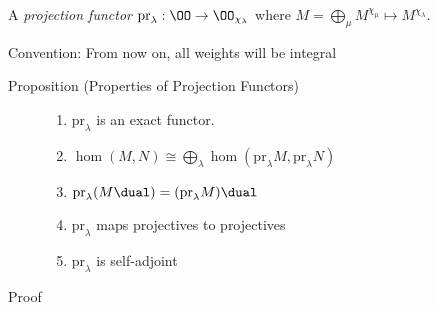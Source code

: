 \begin{description}
\tightlist
\item[Definition (Projection Functors)]
A \emph{projection functor}
\(\mathrm{pr}_\lambda: \OO \to \OO_{\chi_\lambda}\) where
\(M = \bigoplus_\mu M^{\chi_\mu} \mapsto M^{\chi_\lambda}\).
\end{description}

Convention: From now on, all weights will be integral

\begin{description}
\item[Proposition (Properties of Projection Functors)]
\hfill

\begin{enumerate}
\def\labelenumi{\arabic{enumi}.}
\tightlist
\item
  \(\mathrm{pr}_\lambda\) is an exact functor.
\item
  \(\hom(M, N) \cong \bigoplus_\lambda \hom(\mathrm{pr}_\lambda M, \mathrm{pr}_\lambda N)\)
\item
  \(\mathrm{pr}_\lambda (M\dual) = (\mathrm{pr}_\lambda M)\dual\)
\item
  \(\mathrm{pr}_\lambda\) maps projectives to projectives
\item
  \(\mathrm{pr}_\lambda\) is self-adjoint
\end{enumerate}
\item[Proof]
\hfill


\end{description}
